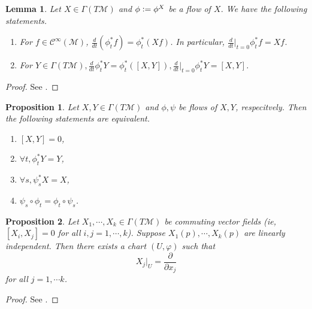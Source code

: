 \documentclass[8pt]{article}
\newtheorem{proposition}{Proposition}[section]
\newtheorem{lemma}{Lemma}[section]
\newcommand{\defeq}{\vcentcolon=}
\newcommand{\R}[0]{\mathbb{R}}
\newcommand{\M}[0]{\mathcal{M}}
\newcommand{\cinf}[0]{\mathcal{C}^\infty}
\newcommand{\pd}[2]{{\frac {\partial #1} {\partial #2}}}
\begin{document}
\begin{lemma}
  Let $X\in\Gamma(T\M)$ and $\phi \defeq \phi^X$ be a flow of $X$. We have the following statements.
  \begin{enumerate}[1).]
    \item For $f\in\cinf(\M)$, ${\frac d {dt}}(\phi_t^*f) = \phi_t^*(Xf)$. In particular, ${\frac d {dt}}|_{t=0}\phi^*_tf = Xf$.
    \item For $Y\in\Gamma(T\M),{\frac d {dt}}\phi_t^*Y=\phi_t^*([X,Y]),{\frac d {dt}}|_{t=0}\phi^*_tY = [X,Y]$.
  \end{enumerate}
\end{lemma}

\begin{proof}
  See \cite{Lee}.
\end{proof}

\begin{proposition}
  Let $X,Y\in\Gamma(T\M)$ and $\phi,\psi$ be flows of $X,Y$, respecitvely. Then the following statements are equivalent.
  \begin{enumerate}[1).]
    \item $[X,Y]=0$, 
    \item $\forall t, \phi^*_tY = Y$,
    \item $\forall s, \psi^*_sX = X$,
    \item $\psi_s\circ\phi_t = \phi_t\circ\psi_s$.
  \end{enumerate}
\end{proposition}

\begin{proposition}
  Let $X_1,\cdots,X_k\in\Gamma(T\M)$ be commuting vector fields (ie, $[X_i,X_j] = 0$ for all $i,j=1,\cdots,k$).
  Suppose $X_1(p),\cdots,X_k(p)$ are linearly independent. Then there exists a chart $(U,\varphi)$ such that 
  \begin{equation*}
    X_j|_U = \pd{}{x_j}
  \end{equation*}
  for all $j=1,\cdots k$.
\end{proposition}

\begin{proof}
See \cite{Lee}.
\end{proof}
\end{document}
